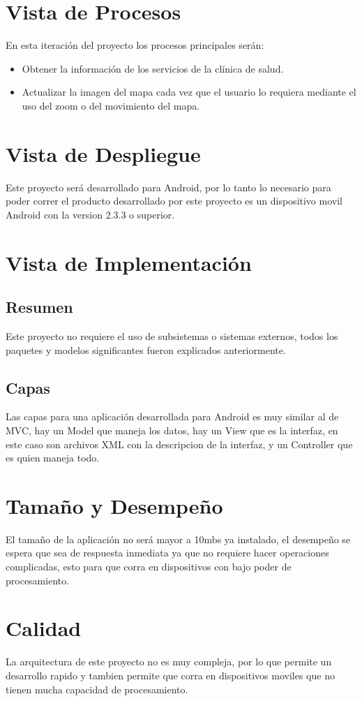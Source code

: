 \documentclass[12pt]{article}
\begin{document}
\section{Vista de Procesos}
En esta iteraci\'on del proyecto los procesos principales ser\'an:

\begin{itemize}
	\item{Obtener la informaci\'on de los servicios de la cl\'inica de salud.}
	\item{Actualizar la imagen del mapa cada vez que el usuario lo requiera mediante el uso del zoom o del movimiento del mapa.}
\end{itemize}

\section{Vista de Despliegue}
Este proyecto ser\'a desarrollado para Android, por lo tanto lo necesario para poder correr el producto desarrollado por este proyecto es un dispositivo movil Android con la version 2.3.3 o superior.

\section{Vista de Implementaci\'on}


\subsection{Resumen}
Este proyecto no requiere el uso de subsistemas o sistemas externos, todos los paquetes y modelos significantes fueron explicados anteriormente.

\subsection{Capas}
Las capas para una aplicaci\'on desarrollada para Android es muy similar al de MVC, hay un Model que maneja los datos, hay un View que es la interfaz, en este caso son archivos XML con la descripcion de la interfaz, y un Controller que es quien maneja todo.


\section{Tama\~no y Desempe\~no}
El tama\~no de la aplicaci\'on no ser\'a mayor a 10mbs ya instalado, el desempe\~no se espera que sea de respuesta inmediata ya que no requiere hacer operaciones complicadas, esto para que corra en dispositivos con bajo poder de procesamiento.

\section{Calidad}
La arquitectura de este proyecto no es muy compleja, por lo que permite un desarrollo rapido y tambien permite que corra en dispositivos moviles que no tienen mucha capacidad de procesamiento.
\end{document}
